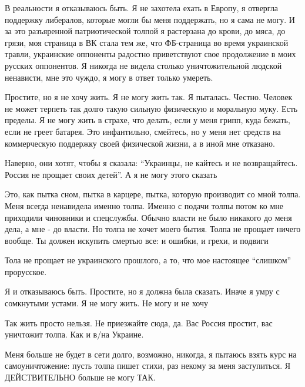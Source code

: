 В реальности я отказываюсь быть. Я не захотела ехать в Европу, я отвергла
поддержку либералов, которые могли бы меня поддержать, но я сама не могу. И за
это разъяренной патриотической толпой я растерзана до крови, до мяса, до грязи,
моя страница в ВК стала тем же, что ФБ-страница во время украинской травли,
украинские оппоненты радостно приветствуют свое продолжение в моих русских
оппонентов. Я никогда не видела столько уничтожительной людской ненависти, мне
это чуждо, я могу в ответ только умереть.

Простите, но я не хочу жить. Я не могу жить так. Я пыталась. Честно. Человек не
может терпеть так долго такую сильную физическую и моральную муку. Есть
пределы. Я не могу жить в страхе, что делать, если у меня грипп, куда бежать,
если не греет батарея. Это инфантильно, смейтесь, но у меня нет средств на
коммерческую поддержку своей физической жизни, а в иной мне отказано.

Наверно, они хотят, чтобы я сказала: \enquote{Украинцы, не кайтесь и не возвращайтесь.
Россия не прощает своих детей}. А я не могу этого сказать

Это, как пытка сном, пытка в карцере, пытка, которую производит со мной толпа.
Меня всегда ненавидела именно толпа. Именно с подачи толпы потом ко мне
приходили чиновники и спецслужбы. Обычно власти не было никакого до меня дела,
а мне - до власти. Но толпа не хочет моего бытия. Толпа не прощает ничего
вообще. Ты должен искупить смертью все: и ошибки, и грехи, и подвиги

Тола не прощает не украинского прошлого, а то, что мое настоящее \enquote{слишком}
прорусское. 

Я и отказываюсь быть. Простите, но я должна была сказать. Иначе я умру с
сомкнутыми устами. Я не могу жить. Не могу и не хочу

Так жить просто нельзя. Не приезжайте сюда, да. Вас  Россия простит, вас
уничтожит толпа. Как и в/на Украине.

Меня больше не будет в сети долго, возможно, никогда, я пытаюсь взять курс на
самоуничтожение: пусть толпа пишет стихи, раз некому за меня заступиться. Я
ДЕЙСТВИТЕЛЬНО больше не могу ТАК.

